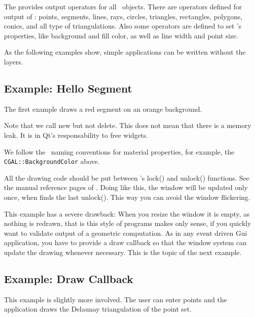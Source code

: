 The  provides output operators for all \cgal\
objects. There are operators defined for output of : points, segments, 
lines, rays, circles, triangles, rectangles, polygons, conics,  and all type of
triangulations. Also some operators are defined to set
's properties, like background and fill color, as
well as line width and point size.

As the following examples show, simple applications can be written
without the layers.

\subsection{Example: Hello Segment}
The first example draws a red segment on an orange background.

Note that we call new but not delete. This does not mean that there is 
a memory leak. It is in Qt's responsability to free widgets.

We follow the \cgalqt\ naming conventions for material properties, for
example, the {\tt CGAL::BackgroundColor} above.

All the drawing code should be put between 's lock() and
unlock() functions. See the manual reference pages of
. Doing like this, the window will be updated only
once, when \ccStyle{Qt\_widget} finds the last unlock(). This way you
can avoid the window flickering.

This example has a severe drawback: When you resize the window it is
empty, as nothing is redrawn, that is this style of programs makes
only sense, if you quickly want to validate output of a geometric
computation. As in any event driven {\sc Gui} application, you have to provide 
a draw callback so that the window system can update the drawing
whenever necessary. This is the topic of the next example.

\subsection{Example: Draw Callback}

This example is slightly more involved. The user can enter points and
the application draws the Delaunay triangulation of the point set. 

